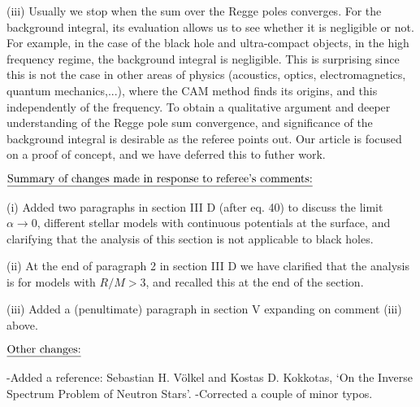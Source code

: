 


\bigskip
\bigskip
(iii)  Usually we stop when the sum over the Regge poles converges. For the background integral, its evaluation allows us to see whether it is negligible or not. For example, in the case of the black hole and ultra-compact objects, in the high frequency regime, the background integral is negligible. This is surprising since this is not the case in other areas of physics (acoustics, optics, electromagnetics, quantum mechanics,...), where the CAM method finds its origins, and this independently of the frequency. To obtain a qualitative argument and deeper understanding of the Regge pole sum convergence, and significance of the background integral is desirable as the referee points out. Our article is focused on a proof of concept, and we have deferred this to futher work.  


\bigskip\bigskip


\noindent $\underline{\hbox{Summary of changes made in response to referee's comments:}}  $
\medskip

\smallskip
(i) Added two paragraphs in section III D (after eq. 40) to discuss the limit $\alpha \rightarrow0$, different stellar models with continuous potentials at the surface, and clarifying that the analysis of this section is not applicable to black holes. 

\bigskip
(ii)  At the end of paragraph 2 in section III D we have clarified that the analysis is for models with $R/M>3$, and recalled this at the end of the section. 

\bigskip
(iii) Added a (penultimate) paragraph in section V expanding on comment (iii) above. 






\bigskip\bigskip


\noindent $\underline{\hbox{Other changes:}}  $
\medskip

\smallskip
-Added a reference: Sebastian H. V{\"o}lkel and Kostas D. Kokkotas, `On the Inverse Spectrum Problem of Neutron Stars'.
\bigskip
-Corrected a couple of minor typos. 



\vfill \eject \bye





